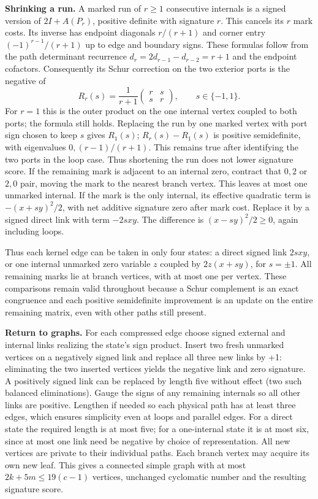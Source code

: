 \documentclass[11pt]{article}
\begin{document}
\textbf{Shrinking a run.} A marked run of \(r\ge 1\) consecutive internals is a signed version of \(2I+A(P_r)\), positive definite with signature \(r\). This cancels its \(r\) mark costs. Its inverse has endpoint diagonals \(r/(r+1)\) and corner entry \((-1)^{r-1}/(r+1)\) up to edge and boundary signs. These formulas follow from the path determinant recurrence \(d_r=2d_{r-1}-d_{r-2}=r+1\) and the endpoint cofactors. Consequently its Schur correction on the two exterior ports is the negative of
\[
R_r(s)=\frac{1}{r+1}\begin{pmatrix}r&s\\s&r\end{pmatrix},\qquad s\in\{-1,1\}.
\]
For \(r=1\) this is the outer product on the one internal vertex coupled to both ports; the formula still holds. Replacing the run by one marked vertex with port sign chosen to keep \(s\) gives \(R_1(s)\); \(R_r(s)-R_1(s)\) is positive semidefinite, with eigenvalues \(0,(r-1)/(r+1)\). This remains true after identifying the two ports in the loop case. Thus shortening the run does not lower signature score. If the remaining mark is adjacent to an internal zero, contract that \(0,2\) or \(2,0\) pair, moving the mark to the nearest branch vertex. This leaves at most one unmarked internal. If the mark is the only internal, its effective quadratic term is \(-(x+sy)^2/2\), with net additive signature zero after mark cost. Replace it by a signed direct link with term \(-2sxy\). The difference is \((x-sy)^2/2\ge 0\), again including loops.

Thus each kernel edge can be taken in only four states: a direct signed link \(2sxy\), or one internal unmarked zero variable \(z\) coupled by \(2z(x+sy)\), for \(s=\pm 1\). All remaining marks lie at branch vertices, with at most one per vertex. These comparisons remain valid throughout because a Schur complement is an exact congruence and each positive semidefinite improvement is an update on the entire remaining matrix, even with other paths still present.

\textbf{Return to graphs.} For each compressed edge choose signed external and internal links realizing the state's sign product. Insert two fresh unmarked vertices on a negatively signed link and replace all three new links by +1: eliminating the two inserted vertices yields the negative link and zero signature. A positively signed link can be replaced by length five without effect (two such balanced eliminations). Gauge the signs of any remaining internals so all other links are positive. Lengthen if needed so each physical path has at least three edges, which ensures simplicity even at loops and parallel edges. For a direct state the required length is at most five; for a one-internal state it is at most six, since at most one link need be negative by choice of representation. All new vertices are private to their individual paths. Each branch vertex may acquire its own new leaf. This gives a connected simple graph with at most \(2k+5m\le 19(c-1)\) vertices, unchanged cyclomatic number and the resulting signature score.
\end{document}

